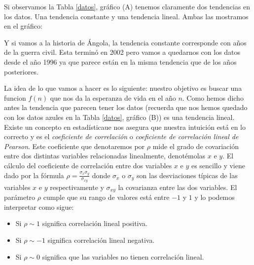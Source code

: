 Si observamos la Tabla \ref{datos}, gráfico (A) tenemos claramente dos
tendencias en los datos. Una tendencia constante y una tendencia
lineal. Ambas las mostramos en el gráfico:

Y si vamos a la historia de Ángola, la tendencia constante corresponde
con años de la guerra civil. Esta terminó en 2002 pero vamos a
quedarnos con los datos desde el año 1996 ya que parece están en la
misma tendencia que de los años posteriores.

La idea de lo que vamos a hacer es lo siguiente: nuestro objetivo es
buscar una funcion $f(n)$ que nos da la esperanza de vida en el año
$n$. Como hemos dicho antes la tendencia que parecen tener los datos
(recuerda que nos hemos quedado con los datos azules en la Tabla
\ref{datos}, gráfico (B)) es una tendencia lineal. Existe un concepto en
estadísticaue nos asegura que nuestra intuición está en lo correcto y
es el \emph{coeficiente de correlación} o \emph{coeficiente de
  correlación lineal de Pearson}. Este coeficiente que denotaremos por
$\rho$ mide el grado de covariación entre dos distintas variables
relacionadas linealmente, denotémolas $x$ e $y$. El cálculo del
coeficiente de correlación entre dos variables $x$ e $y$ es sencillo y
viene dado por la fórmula $\rho=\frac{\sigma_x \sigma_y}{\sigma_{xy}}$
donde $\sigma_x$ o $\sigma_y$ son las desviaciones típicas de las
variables $x$ e $y$ respectivamente y $\sigma_{xy}$ la covarianza
entre las dos variables. El parámetro $\rho$ cumple que su rango de
valores está entre $-1$ y $1$ y lo podemos interpretar como sigue:
\begin{itemize}
\item Si $\rho \sim 1$ significa correlación lineal positiva.
\item Si $\rho \sim -1$ significa correlación lineal negativa.
\item Si $\rho \sim 0$ significa que las variables no tienen correlación lineal.
\end{itemize}

